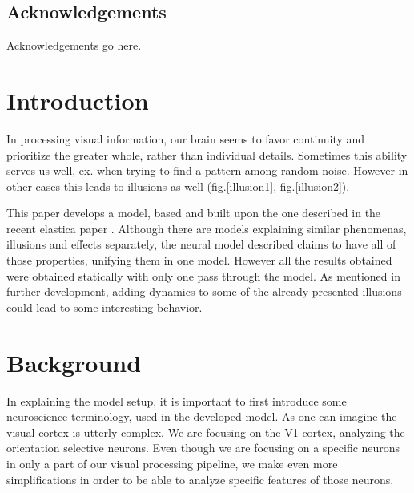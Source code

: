 \maketitle

\section*{Acknowledgements}
Acknowledgements go here. 

\tableofcontents



\chapter{Introduction}

In processing visual information, our brain seems to favor continuity and prioritize the greater whole, rather than individual details. Sometimes this ability serves us well, ex. when trying to find a pattern among random noise. However in other cases this leads to illusions as well (fig.\ref{illusion1}, fig.\ref{illusion2}). 

This paper develops a model, based and built upon the one described in the recent elastica paper \cite{keemink2015unified}. Although there are models explaining similar phenomenas, illusions and effects separately, the neural model described claims to have all of those properties, unifying them in one model. However all the results obtained were obtained statically with only one pass through the model. As mentioned in further development, adding dynamics to some of the already presented illusions could lead to some interesting behavior.







\chapter{Background}

In explaining the model setup, it is important to first introduce some neuroscience terminology, used in the developed model. As one can imagine the visual cortex is utterly complex. We are focusing on the V1 cortex, analyzing the orientation selective neurons. Even though we are focusing on a specific neurons in only a part of our visual processing pipeline, we make even more simplifications in order to be able to analyze specific features of those neurons. 


